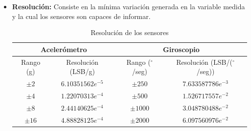 \documentclass[12pt,a4paper]{article}
\newcommand{\grad}{$^{\circ}$}
\begin{document}
\begin{itemize}
	\item \textbf{Resolución:} Consiste en la mínima variación generada en la variable medida y la cual los sensores son capaces de informar.
	
	\begin{table}[H]
		\centering
		\label{table:resolucionSensor}
		\begin{tabular}{|c|c|c|c|}
			\hline
			\multicolumn{2}{|c|}{Acelerómetro} &\multicolumn{2}{|c|}{Giroscopio}   \\
			\hline
			Rango (g)        & Resolución (LSB/g)  & Rango (\grad/seg)     &  Resolución (LSB/(\grad/seg))\\ \hline
			$\pm 2$     &  $6.10351562e^{-5}$   &$\pm 250 $ 	& 	$7.633587786e^{-3}$ 	\\ 
			$\pm 4$     &  $1.22070313e^{-4}$  	&$\pm 500 $ 	& 	$1.526717557e^{-2}$    	\\
			$\pm 8$     &  $2.44140625e^{-4}$ 	& $\pm 1000$  	& 	$3.048780488e^{-2}$		\\
			$\pm 16$    &  $4.88828125e^{-4}$   & $\pm 2000$    & 	$6.097560976e^{-2}$     \\ 
			\hline
		\end{tabular}
		\caption{Resolución de los sensores}
	\end{table}
	
\end{itemize}
\end{document}
